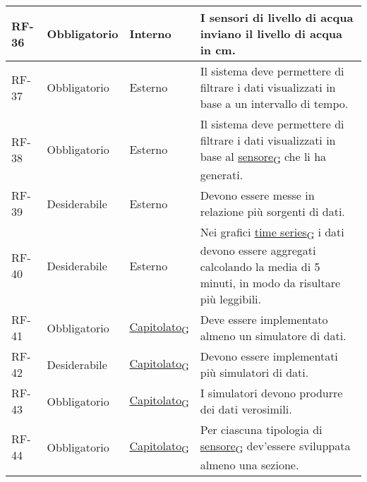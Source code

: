 \begin{longtable}{|>{\centering\arraybackslash}m{}|>{\centering\arraybackslash}m{}|>{\centering\arraybackslash}m{}|>{\centering\arraybackslash}m{}|}
	\\\hline
	RF-36           & Obbligatorio        & Interno                                                                                                           & I sensori di livello di acqua inviano il livello di acqua in cm.
	\\\hline
	RF-37           & Obbligatorio        & Esterno                                                                                                           & Il sistema deve permettere di filtrare i dati visualizzati in base a un intervallo di tempo.
	\\\hline
	RF-38           & Obbligatorio        & Esterno                                                                                                           & Il sistema deve permettere di filtrare i dati visualizzati in base al \href{https://7last.github.io/docs/rtb/documentazione-interna/glossario\#sensore}{sensore\textsubscript{G}} che li ha generati.
	\\\hline
	RF-39           & Desiderabile        & Esterno                                                                                                           & Devono essere messe in relazione più sorgenti di dati.
	\\\hline
	RF-40           & Desiderabile        & Esterno                                                                                                           & Nei grafici \href{https://7last.github.io/docs/rtb/documentazione-interna/glossario\#time-series}{time series\textsubscript{G}} i dati devono essere aggregati calcolando la media di 5 minuti, in modo da risultare più leggibili.
	\\\hline
	RF-41           & Obbligatorio        & \href{https://7last.github.io/docs/rtb/documentazione-interna/glossario\#capitolato}{Capitolato\textsubscript{G}} & Deve essere implementato almeno un simulatore di dati.
	\\\hline
	RF-42           & Desiderabile        & \href{https://7last.github.io/docs/rtb/documentazione-interna/glossario\#capitolato}{Capitolato\textsubscript{G}} & Devono essere implementati più simulatori di dati.
	\\\hline
	RF-43           & Obbligatorio        & \href{https://7last.github.io/docs/rtb/documentazione-interna/glossario\#capitolato}{Capitolato\textsubscript{G}} & I simulatori devono produrre dei dati verosimili.
	\\\hline
	RF-44           & Obbligatorio        & \href{https://7last.github.io/docs/rtb/documentazione-interna/glossario\#capitolato}{Capitolato\textsubscript{G}} & Per ciascuna tipologia di \href{https://7last.github.io/docs/rtb/documentazione-interna/glossario\#sensore}{sensore\textsubscript{G}} dev'essere sviluppata almeno una sezione.

\end{longtable}
